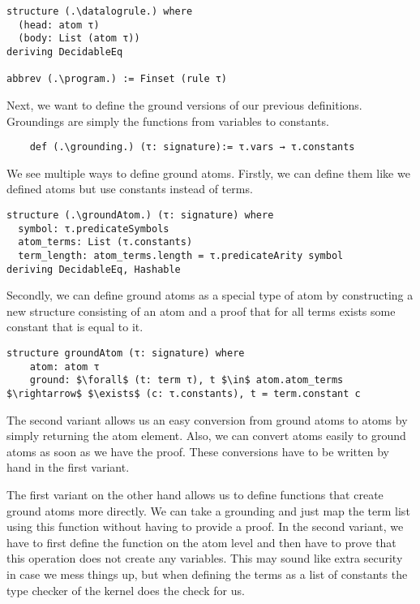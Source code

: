 \begin{lstlisting}
structure (.\datalogrule.) where
  (head: atom τ)
  (body: List (atom τ))
deriving DecidableEq

abbrev (.\program.) := Finset (rule τ)
\end{lstlisting}

Next, we want to define the ground versions of our previous definitions. Groundings are simply the functions from variables to constants.

\begin{lstlisting}
    def (.\grounding.) (τ: signature):= τ.vars → τ.constants
\end{lstlisting}

We see multiple ways to define ground atoms. Firstly, we can define them like we defined atoms but use constants instead of terms. 

\begin{lstlisting}
structure (.\groundAtom.) (τ: signature) where
  symbol: τ.predicateSymbols
  atom_terms: List (τ.constants)
  term_length: atom_terms.length = τ.predicateArity symbol
deriving DecidableEq, Hashable
\end{lstlisting}

Secondly, we can define ground atoms as a special type of atom by constructing a new structure consisting of an atom and a proof that for all terms exists some constant that is equal to it.

\begin{lstlisting}
structure groundAtom (τ: signature) where
    atom: atom τ
    ground: $\forall$ (t: term τ), t $\in$ atom.atom_terms $\rightarrow$ $\exists$ (c: τ.constants), t = term.constant c
\end{lstlisting}

The second variant allows us an easy conversion from ground atoms to atoms by simply returning the atom element. Also, we can convert atoms easily to ground atoms as soon as we have the proof. These conversions have to be written by hand in the first variant.

The first variant on the other hand allows us to define functions that create ground atoms more directly. We can take a grounding and just map the term list using this function without having to provide a proof. In the second variant, we have to first define the function on the atom level and then have to prove that this operation does not create any variables. This may sound like extra security in case we mess things up, but when defining the terms as a list of constants the type checker of the kernel does the check for us.

